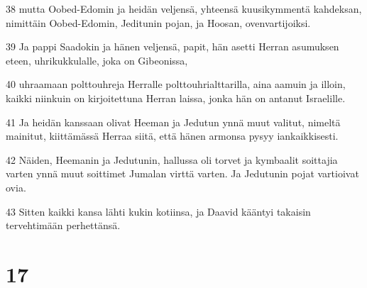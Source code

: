 \par 38 mutta Oobed-Edomin ja heidän veljensä, yhteensä kuusikymmentä kahdeksan, nimittäin Oobed-Edomin, Jeditunin pojan, ja Hoosan, ovenvartijoiksi.
\par 39 Ja pappi Saadokin ja hänen veljensä, papit, hän asetti Herran asumuksen eteen, uhrikukkulalle, joka on Gibeonissa,
\par 40 uhraamaan polttouhreja Herralle polttouhrialttarilla, aina aamuin ja illoin, kaikki niinkuin on kirjoitettuna Herran laissa, jonka hän on antanut Israelille.
\par 41 Ja heidän kanssaan olivat Heeman ja Jedutun ynnä muut valitut, nimeltä mainitut, kiittämässä Herraa siitä, että hänen armonsa pysyy iankaikkisesti.
\par 42 Näiden, Heemanin ja Jedutunin, hallussa oli torvet ja kymbaalit soittajia varten ynnä muut soittimet Jumalan virttä varten. Ja Jedutunin pojat vartioivat ovia.
\par 43 Sitten kaikki kansa lähti kukin kotiinsa, ja Daavid kääntyi takaisin tervehtimään perhettänsä.

\chapter{17}

